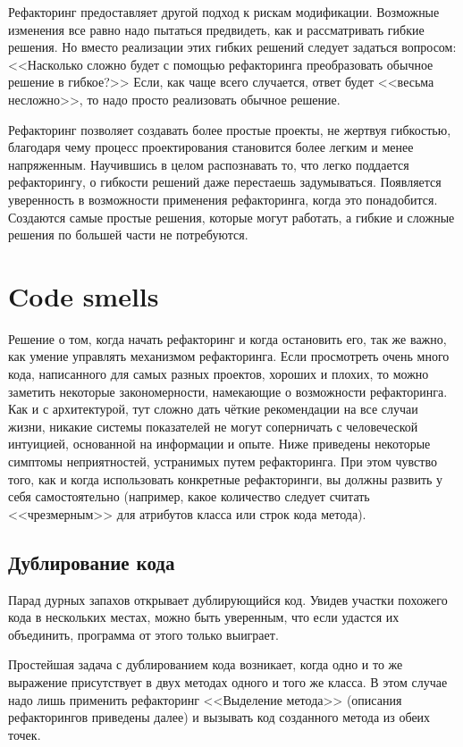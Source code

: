 \documentclass{../../text-style}
\begin{document}
Рефакторинг предоставляет другой подход к рискам модификации. Возможные изменения все равно надо пытаться предвидеть, как и рассматривать гибкие решения. Но вместо реализации этих гибких решений следует задаться вопросом: <<Насколько сложно будет с помощью рефакторинга преобразовать обычное решение в гибкое?>> Если, как чаще всего случается, ответ будет <<весьма несложно>>, то надо просто реализовать обычное решение.

Рефакторинг позволяет создавать более простые проекты, не жертвуя гибкостью, благодаря чему процесс проектирования становится более легким и менее напряженным. Научившись в целом распознавать то, что легко поддается рефакторингу, о гибкости решений даже перестаешь задумываться. Появляется уверенность в возможности применения рефакторинга, когда это понадобится. Создаются самые простые решения, которые могут работать, а гибкие и сложные решения по большей части не потребуются.

\section{Code smells}

Решение о том, когда начать рефакторинг и когда остановить его, так же важно, как умение управлять механизмом рефакторинга. Если просмотреть очень много кода, написанного для самых разных проектов, хороших и плохих, то можно заметить некоторые закономерности, намекающие о возможности рефакторинга. Как и с архитектурой, тут сложно дать чёткие рекомендации на все случаи жизни, никакие системы показателей не могут соперничать с человеческой интуицией, основанной на информации и опыте. Ниже приведены некоторые симптомы неприятностей, устранимых путем рефакторинга. При этом чувство того, как и когда использовать конкретные рефакторинги, вы должны развить у себя самостоятельно (например, какое количество следует считать <<чрезмерным>> для атрибутов класса или строк кода метода).

\subsection{Дублирование кода}

Парад дурных запахов открывает дублирующийся код. Увидев участки похожего кода в нескольких местах, можно быть уверенным, что если удастся их объединить, программа от этого только выиграет.

Простейшая задача с дублированием кода возникает, когда одно и то же выражение присутствует в двух методах одного и того же класса. В этом случае надо лишь применить рефакторинг <<Выделение метода>> (описания рефакторингов приведены далее) и вызывать код созданного метода из обеих точек.
\end{document}
